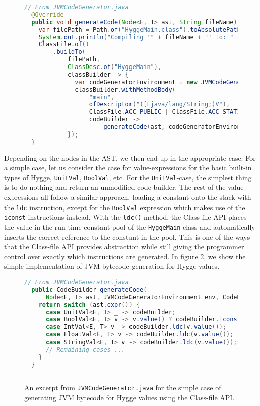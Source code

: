 \begin{figure}[H]
\centering 
\begin{lstlisting}[language=Java]
  // From JVMCodeGenerator.java
  @Override
  public void generateCode(Node<E, T> ast, String fileName) throws IOException {
    var filePath = Path.of("HyggeMain.class").toAbsolutePath();
    System.out.println("Compiling '" + fileName + "' to: " + filePath);
    ClassFile.of()
        .buildTo(
            filePath,
            ClassDesc.of("HyggeMain"),
            classBuilder -> {
              var codeGeneratorEnvironment = new JVMCodeGeneratorEnvironment(classBuilder);
              classBuilder.withMethodBody(
                  "main",
                  ofDescriptor("([Ljava/lang/String;)V"),
                  ClassFile.ACC_PUBLIC | ClassFile.ACC_STATIC,
                  codeBuilder ->
                      generateCode(ast, codeGeneratorEnvironment, codeBuilder).return_());
            });
  }
\end{lstlisting}
\caption{}
\label{}
\end{figure}

Depending on the nodes in the AST, we then end up in the appropriate case. For a simple case, let us consider the case
for value-expressions for the basic built-in types of Hygge, \texttt{UnitVal}, \texttt{BoolVal}, etc. For the \texttt{UnitVal}-case,
the simplest thing is to do nothing and return an unmodified code builder. The rest of the value expressions all follow a similar approach,
loading a constant onto the stack with the \texttt{ldc} instruction, except for the \texttt{BoolVal} expression which makes use of the
\texttt{iconst} instructions instead. With the \texttt{ldc()}-method, the Class-file API places the value in the run-time constant pool
of the \texttt{HyggeMain} class and automatically inserts the correct reference to the constant in the pool. This is one of the ways
that the Class-file API provides abstraction while still giving the programmer control over exactly which instructions are generated.
In figure \ref{fig:jvm_value_codegen}, we show the
simple implementation of JVM bytecode generation for Hygge values.

\begin{figure}[H]
\centering
\begin{lstlisting}[language=Java]
  // From JVMCodeGenerator.java
  public CodeBuilder generateCode(
      Node<E, T> ast, JVMCodeGeneratorEnvironment env, CodeBuilder codeBuilder) {
    return switch (ast.expr()) {
      case UnitVal<E, T> _ -> codeBuilder;
      case BoolVal<E, T> v -> v.value() ? codeBuilder.iconst_1() : codeBuilder.iconst_0();
      case IntVal<E, T> v -> codeBuilder.ldc(v.value());
      case FloatVal<E, T> v -> codeBuilder.ldc(v.value());
      case StringVal<E, T> v -> codeBuilder.ldc(v.value());
      // Remaining cases ... 
    }
  }
 
\end{lstlisting}
\caption{An excerpt from \texttt{JVMCodeGenerator.java} for the simple case of generating JVM bytecode for Hygge values using the Class-file API.}
\label{fig:jvm_value_codegen}
\end{figure}

